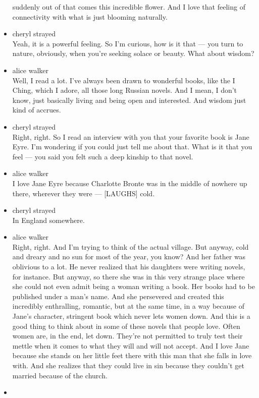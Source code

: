 \begin{itemize}
  suddenly out of that comes this incredible flower. And I love that
  feeling of connectivity with what is just blooming naturally.
\item
  cheryl strayed\\
  Yeah, it is a powerful feeling. So I'm curious, how is it that --- you
  turn to nature, obviously, when you're seeking solace or beauty. What
  about wisdom?
\item
  alice walker\\
  Well, I read a lot. I've always been drawn to wonderful books, like
  the I Ching, which I adore, all those long Russian novels. And I mean,
  I don't know, just basically living and being open and interested. And
  wisdom just kind of accrues.
\item
  cheryl strayed\\
  Right, right. So I read an interview with you that your favorite book
  is Jane Eyre. I'm wondering if you could just tell me about that. What
  is it that you feel --- you said you felt such a deep kinship to that
  novel.
\item
  alice walker\\
  I love Jane Eyre because Charlotte Bronte was in the middle of nowhere
  up there, wherever they were --- {[}LAUGHS{]} cold.
\item
  cheryl strayed\\
  In England somewhere.
\item
  alice walker\\
  Right, right. And I'm trying to think of the actual village. But
  anyway, cold and dreary and no sun for most of the year, you know? And
  her father was oblivious to a lot. He never realized that his
  daughters were writing novels, for instance. But anyway, so there she
  was in this very strange place where she could not even admit being a
  woman writing a book. Her books had to be published under a man's
  name. And she persevered and created this incredibly enthralling,
  romantic, but at the same time, in a way because of Jane's character,
  stringent book which never lets women down. And this is a good thing
  to think about in some of these novels that people love. Often women
  are, in the end, let down. They're not permitted to truly test their
  mettle when it comes to what they will and will not accept. And I love
  Jane because she stands on her little feet there with this man that
  she falls in love with. And she realizes that they could live in sin
  because they couldn't get married because of the church.
\item

\end{itemize}
